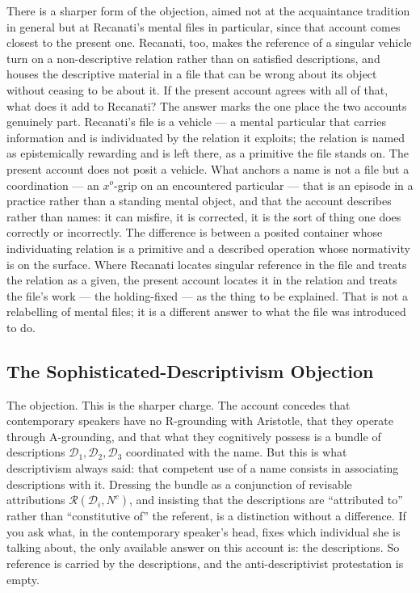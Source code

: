 \documentclass[12pt,a4paper]{article}
\begin{document}
There is a sharper form of the objection, aimed not at the acquaintance tradition in general but at Recanati's mental files in particular, since that account comes closest to the present one. Recanati, too, makes the reference of a singular vehicle turn on a non-descriptive relation rather than on satisfied descriptions, and houses the descriptive material in a file that can be wrong about its object without ceasing to be about it. If the present account agrees with all of that, what does it add to Recanati? The answer marks the one place the two accounts genuinely part. Recanati's file is a vehicle --- a mental particular that carries information and is individuated by the relation it exploits; the relation is named as epistemically rewarding and is left there, as a primitive the file stands on. The present account does not posit a vehicle. What anchors a name is not a file but a coordination --- an \(x^o\)-grip on an encountered particular --- that is an episode in a practice rather than a standing mental object, and that the account describes rather than names: it can misfire, it is corrected, it is the sort of thing one does correctly or incorrectly. The difference is between a posited container whose individuating relation is a primitive and a described operation whose normativity is on the surface. Where Recanati locates singular reference in the file and treats the relation as a given, the present account locates it in the relation and treats the file's work --- the holding-fixed --- as the thing to be explained. That is not a relabelling of mental files; it is a different answer to what the file was introduced to do.

\subsection{The Sophisticated-Descriptivism Objection}\label{the-sophisticated-descriptivism-objection}

The objection. This is the sharper charge. The account concedes that contemporary speakers have no R-grounding with Aristotle, that they operate through A-grounding, and that what they cognitively possess is a bundle of descriptions \(\mathcal{D}_1, \mathcal{D}_2, \mathcal{D}_3\) coordinated with the name. But this is what descriptivism always said: that competent use of a name consists in associating descriptions with it. Dressing the bundle as a conjunction of revisable attributions \(\mathcal{R}(\mathcal{D}_i, N^c)\), and insisting that the descriptions are ``attributed to'' rather than ``constitutive of'' the referent, is a distinction without a difference. If you ask what, in the contemporary speaker's head, fixes which individual she is talking about, the only available answer on this account is: the descriptions. So reference is carried by the descriptions, and the anti-descriptivist protestation is empty.
\end{document}
